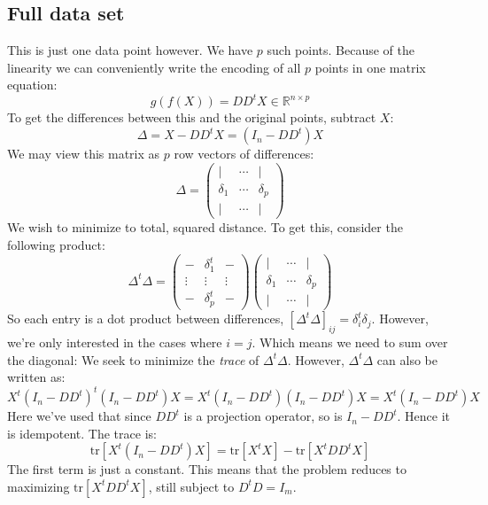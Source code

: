 \documentclass[12pt, a4paper]{article}
\numberwithin{equation}{section}
\begin{document}
\subsection{Full data set}
This is just one data point however. We have $p$ such points. Because of the linearity we can conveniently write the encoding of all $p$ points in one matrix equation:
\begin{equation}
g(f(X))=DD^t X\in\mathbb{R}^{n\times p}
\end{equation}
To get the differences between this and the original points, subtract $X$:
\begin{equation}
\Delta=X-DD^t X=(I_n-DD^t)X
\end{equation}
We may view this matrix as $p$ row vectors of differences:
\begin{equation}
\Delta=
\begin{pmatrix}
| & \cdots & | \\
\delta_1 & \cdots & \delta_p \\
| & \cdots & |
\end{pmatrix}
\end{equation}
We wish to minimize to total, squared distance. To get this, consider the following product:
\begin{equation}
\Delta^t \Delta=
\begin{pmatrix}
- & \delta_1^t & -\\
\vdots & \vdots & \vdots \\
- & \delta_p^t & -
\end{pmatrix}
\begin{pmatrix}
| & \cdots & | \\
\delta_1 & \cdots & \delta_p \\
| & \cdots & |
\end{pmatrix}
\end{equation}
So each entry is a dot product between differences, $[\Delta^t \Delta]_{ij}=\delta_i^t\delta_j$. However, we're only interested in the cases where $i=j$. Which means we need to sum over the diagonal: We seek to minimize the \textit{trace} of $\Delta^t \Delta$. However, $\Delta^t \Delta$ can also be written as:
\begin{equation}
X^t(I_n-DD^t)^t(I_n-DD^t)X=X^t(I_n-DD^t)(I_n-DD^t)X=X^t(I_n-DD^t)X
\end{equation}
Here we've used that since $DD^t$ is a projection operator, so is $I_n-DD^t$. Hence it is idempotent. The trace is:
\begin{equation}
\textrm{tr}[X^t(I_n-DD^t)X]=\textrm{tr}[X^tX]-\textrm{tr}[X^t DD^t X]
\end{equation}
The first term is just a constant. This means that the problem reduces to maximizing $\textrm{tr}[X^t DD^t X]$, still subject to $D^t D=I_m$.
\end{document}

